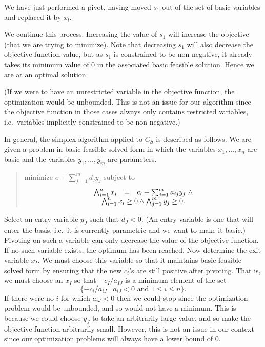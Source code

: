 \documentclass{article}
\begin{document}
We have just performed a pivot, having moved $s_1$ out of the set of basic
variables and replaced it by $x_l$.

We continue this process.  Increasing the value of $s_1$ will increase
the objective (that we are trying to minimize).  Note that decreasing $s_1$ will also decrease the
objective function value, but as $s_1$ is constrained to be non-negative,
it already takes its minimum value of $0$ in the associated basic feasible
solution.  Hence we are at an optimal solution.  

(If we were to have an unrestricted variable in the objective function, the
optimization would be unbounded.  This is not an issue for our algorithm 
since the objective function in those cases always only contains
restricted variables, i.e.\ variables implicitly constrained to be
non-negative.)

In general, the simplex algorithm applied to $C_S$ 
is described as follows. 
We are given a problem in basic feasible solved form in which 
the variables $x_1, \ldots ,x_n$ are basic and the variables
$y_1, \ldots ,y_m$ are parameters.
\begin{quote}\vspace*{-1ex}
minimize $e + \sum_{j=1}^{m} d_j y_j$
subject to 
$$
\begin{array}{rcr}
        \bigwedge_{i=1}^{n} x_i & = & c_i + \sum_{j=1}^{m} a_{ij} y_j ~\wedge\\
                  \multicolumn{3}{c}{\bigwedge_{i=1}^{n} x_i \ge 0 \wedge
                  \bigwedge_{j=1}^{m} y_j \ge 0. }
            \end{array}
$$
\end{quote}\vspace{-0.9ex}
Select an entry variable $y_J$ such that $d_J < 0$.  (An entry variable is
one that will enter the basis, i.e.\ it is currently parametric and we want
to make it basic.)
Pivoting on such a variable can only decrease the value of the objective
function.
If no such variable exists, the optimum has been reached.
Now determine the exit variable $x_I$\@.  We must choose this variable so that
it maintains  basic feasible solved form by ensuring 
that the new $c_i$'s are still positive after pivoting. 
That is, we must choose an $x_I$ 
so that $- c_I/ a_{IJ}$ is a minimum element
of the set
$$
\{ -c_i/a_{iJ} \mid a_{iJ} < 0 \mbox{ and } 1 \le i \le n \}.
$$
If there were no $i$ for which $a_{iJ} < 0$ then we could stop since the
optimization problem would be unbounded, and so would not have
a minimum.  This is because we could choose $y_J$ to take an arbitrarily
large value, and so make the objective function arbitrarily small.
However, this is not an issue in our context since our
optimization problems will always have a lower bound of 0.
\end{document}
